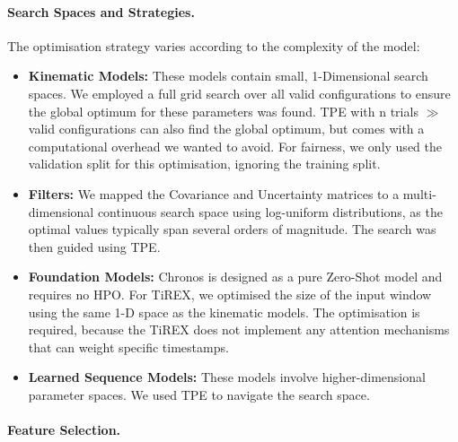                 
        \paragraph{Search Spaces and Strategies.}
        The optimisation strategy varies according to the complexity of the model:
        \begin{itemize}
            \item \textbf{Kinematic Models:} These models contain small, 1-Dimensional search spaces. We employed a full grid search over all valid configurations to ensure the global optimum for these parameters was found.  \ac{TPE} with n trials $\gg$ valid configurations can also find the global optimum, but comes with a computational overhead we wanted to avoid. For fairness, we only used the validation split for this optimisation, ignoring the training split. %
            \item \textbf{Filters:} We mapped the Covariance and Uncertainty matrices to a multi-dimensional continuous search space using log-uniform distributions, as the optimal values typically span several orders of magnitude. The search was then guided using \ac{TPE}.
            \item \textbf{Foundation Models:} Chronos is designed as a pure Zero-Shot model and requires no \ac{HPO}. For TiREX, we optimised the size of the input window using the same 1-D space as the kinematic models. The optimisation is required, because the TiREX does not implement any attention mechanisms that can weight specific timestamps.
            \item \textbf{Learned Sequence Models:} These models involve higher-dimensional parameter spaces. We used \acs{TPE} to navigate the search space.

        \end{itemize}
            
           \paragraph{Feature Selection.} 
           \label{subsub:featureselection}
        
